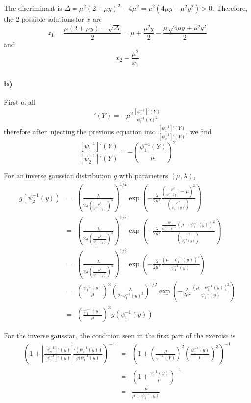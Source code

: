 The discriminant is $\Delta = \mu^2 (2 + \mu y)^2 - 4\mu^2 = \mu^2 (4 \mu y + \mu^2 y^2) > 0$.
Therefore, the $2$ possible solutions for $x$ are
\[x_1 = \frac{\mu(2 + \mu y) - \sqrt{\Delta}}{2} = \mu + \frac{\mu^2 y}{2} - \frac{\mu \sqrt{4 \mu y + \mu^2 y^2}}{2}\]
and
\[x_2 = \frac{\mu^2}{x_1}\]

\subsubsection*{b)}

First of all 
\begin{eqnarray*}
	[\psi_2^{-1}]'(Y) = - \mu^2 \frac{[\psi_1^{-1}]'(Y)}{\psi_1^{-1}(Y)^2}
\end{eqnarray*}
therefore after injecting the previous equation into $\frac{[\psi_1^{-1}]'(Y)}{[\psi_2^{-1}]'(Y)}$, we find 
\[\frac{[\psi_1^{-1}]'(Y)}{[\psi_2^{-1}]'(Y)} = - \left(\frac{\psi_1^{-1}(Y)}{\mu}\right)^2\]


For an inverse gaussian distribution $g$ with parameters $(\mu,\lambda)$,
\begin{eqnarray*}
	g(\psi_2^{-1}(y)) &=& \left( \frac{\lambda}{2 \pi \left(\frac{\mu^2}{\psi_1^{-1}(y)}\right)^3} \right)^{1/2} \exp\left( -\frac{\lambda}{2\mu^2} \frac{\left(\frac{\mu^2}{\psi_1^{-1}(y)} - \mu \right)^2}{\left( \frac{\mu^2}{\psi_1^{-1}(y)} \right)} \right)\\
	&=& \left( \frac{\lambda}{2 \pi \left(\frac{\mu^2}{\psi_1^{-1}(y)}\right)^3} \right)^{1/2} \exp\left( -\frac{\lambda}{2\mu^2} \frac{\frac{\mu^2}{\psi_1^{-1}(y)^2}\left(\mu - \psi_1^{-1}(y) \right)^2}{\left( \frac{\mu^2}{\psi_1^{-1}(y)} \right)} \right)\\
	&=& \left( \frac{\lambda}{2 \pi \left(\frac{\mu^2}{\psi_1^{-1}(y)}\right)^3} \right)^{1/2} \exp\left( -\frac{\lambda}{2\mu^2} \frac{\left(\mu - \psi_1^{-1}(y) \right)^2}{\psi_1^{-1}(y)} \right)\\
	&=& \left( \frac{\psi_1^{-1}(y)}{\mu} \right)^3 \left( \frac{\lambda}{2 \pi \psi_1^{-1}(y)^3} \right)^{1/2} \exp\left( -\frac{\lambda}{2\mu^2} \frac{\left(\mu - \psi_1^{-1}(y) \right)^2}{\psi_1^{-1}(y)} \right)\\
	&=& \left( \frac{\psi_1^{-1}(y)}{\mu} \right)^3 g(\psi_1^{-1}(y)) 
\end{eqnarray*}

For the inverse gaussian, the condition seen in the first part of the exercise is
\begin{eqnarray*}
	\left(1 + \left| \frac{[\psi_2^{-1}]'(y)}{[\psi_1^{-1}]'(y)} \right| \frac {g(\psi_2^{-1}(y))}{g(\psi_1^{-1}(y)} \right)^{-1} &=& \left( 1 + \left(\frac{\mu}{\psi_1^{-1}(Y)}\right)^2 \left( \frac{\psi_1^{-1}(y)}{\mu} \right)^3 \right)^{-1}\\
	&=& \left( 1 + \frac{\psi_1^{-1}(y)}{\mu}\right)^{-1}\\
	&=&\frac{\mu}{\mu + \psi_1^{-1}(y)} 
\end{eqnarray*}

